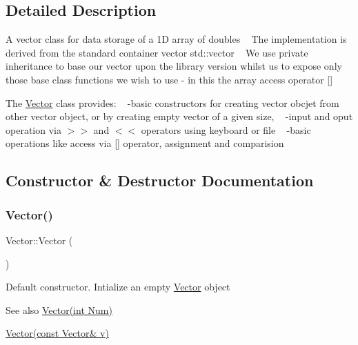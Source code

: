 \subsection{Detailed Description}
A vector class for data storage of a 1D array of doubles ~\newline
 The implementation is derived from the standard container vector std\+::vector ~\newline
 We use private inheritance to base our vector upon the library version whilst  us to expose only those base class functions we wish to use -\/ in this  the array access operator \mbox{[}\mbox{]}

The \hyperlink{class_vector}{Vector} class provides\+: ~\newline
-\/basic constructors for creating vector obcjet from other vector object, or by creating empty vector of a given size, ~\newline
-\/input and oput operation via $>$$>$ and $<$$<$ operators using keyboard or file ~\newline
-\/basic operations like access via \mbox{[}\mbox{]} operator, assignment and comparision 

\subsection{Constructor \& Destructor Documentation}
\mbox{\label{class_vector_a6f80c73b5f18dcf3f8e36065bdc8b9e5}} 
\subsubsection{\texorpdfstring{Vector()}{Vector()}\hspace{0.1cm}{\footnotesize\ttfamily [1/3]}}
{\footnotesize\ttfamily Vector\+::\+Vector (\begin{DoxyParamCaption}{ }\end{DoxyParamCaption})}

Default constructor. Intialize an empty \hyperlink{class_vector}{Vector} object \begin{DoxySeeAlso}{See also}
\hyperlink{class_vector_acbdf66550f2caa0a64e0b356fb63a277}{Vector(int Num)} 

\hyperlink{class_vector_a5f04e343b7306ad11f8a82c89b486764}{Vector(const Vector\& v)} 
\end{DoxySeeAlso}
\mbox{\label{class_vector_acbdf66550f2caa0a64e0b356fb63a277}} 
